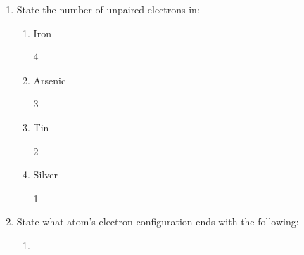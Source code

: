 \documentclass[12pt]{article}
\begin{document}
\begin{enumerate}
\begin{enumerate}
      \item $l=2$

        \begin{center}
          10
        \end{center}

      \item $l=0$

        \begin{center}
          2
        \end{center}

    \end{enumerate}

  \item State the number of unpaired electrons in:

    \begin{enumerate}

      \item Iron

        \begin{center}
          4
        \end{center}

      \item Arsenic

        \begin{center}
          3
        \end{center}

      \item Tin

        \begin{center}
          2
        \end{center}

      \item Silver

        \begin{center}
          1
        \end{center}

    \end{enumerate}

  \item State what atom's electron configuration ends with the following:

    \begin{enumerate}

      \item {}

        \begin{center}
        \end{center}


\end{enumerate}
\end{enumerate}
\end{document}

